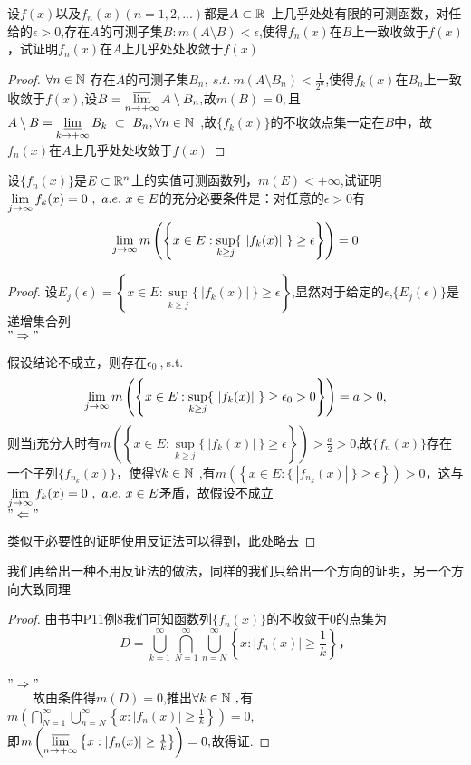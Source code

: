 设$f(x)$以及$f_n(x)(n=1,2,...)$都是$A \subset \R{R}{\ }$上几乎处处有限的可测函数，对任给的$\epsilon>0$,存在$A$的可测子集$B:m(A\setminus B)<\epsilon$,使得$f_n(x)$在$B$上一致收敛于$f(x)$，试证明$f_n(x)$在$A$上几乎处处收敛于$f(x)$
\begin{proof}
	$\forall n\in\R{N}{\ }$存在$A$的可测子集$B_n,\ s.t.\ m(A\setminus B_n)<\frac{1}{2^n}$,使得$f_k(x)$在$B_n$上一致收敛于$f(x)$,设$B=\varlimsup\limits_{n \to +\infty}A\setminus B_n,$故$m(B)=0,$且$A\setminus B=\varliminf\limits_{k \to +\infty}B_k\ \subset\  B_n,\forall n \in \R{N}{\ }$,故$\{f_k(x)\}$的不收敛点集一定在$B$中，故$f_n(x)$在$A$上几乎处处收敛于$f(x)$
\end{proof}


设$\{f_n(x)\}$是$E\subset \mathbb{R}^{n}$上的实值可测函数列，$m(E)<+\infty$,试证明$\lim\limits_{j\to \infty}f_k(x)=0\ ,\ a.e.\ x\in E$的充分必要条件是：对任意的$\epsilon>0$有$$\lim\limits_{j\to\infty}m\left( \left\lbrace x\in E: \sup_{k\geq j} \{\ |f_k(x)|\ \}\geq \epsilon \right\rbrace \right)=0 $$
\begin{proof}
	设$E_j(\epsilon)=\left\lbrace x\in E: \sup\limits_{k\geq j} \{\ |f_k(x)|\ \}\geq \epsilon \right\rbrace$,显然对于给定的$\epsilon$,$\{E_j(\epsilon)\}$是递增集合列\\
	$"\Rightarrow"$\par 
	假设结论不成立，则存在$\epsilon_0\ $,$\ $s.t.$$\lim\limits_{j\to\infty}m\left( \left\lbrace x\in E: \sup\limits_{k\geq j} \{\ |f_k(x)|\ \}\geq \epsilon_0>0 \right\rbrace \right)=a>0 ,$$则当j充分大时有$m\left( \left\lbrace x\in E: \sup\limits_{k\geq j} \{\ |f_k(x)|\ \}\geq \epsilon \right\rbrace \right)>\displaystyle{\frac{a}{2}}>0$,故$\{f_n(x)\}$存在一个子列$\{f_{n_k}(x)\}$，使得$\forall k\in \R{N}{\ }$,有$m\left( \left\lbrace x\in E:  \{\ |f_{n_k}(x)|\ \}\geq \epsilon \right\rbrace \right)>0$，这与$\lim\limits_{j\to \infty}f_k(x)=0\ ,\ a.e.\ x\in E$矛盾，故假设不成立\\
	$"\Leftarrow"$\par 类似于必要性的证明使用反证法可以得到，此处略去
\end{proof}
我们再给出一种不用反证法的做法，同样的我们只给出一个方向的证明，另一个方向大致同理
\begin{proof}
	由书中P11例8我们可知函数列$\{f_n(x)\}$的不收敛于0的点集为$$D=\bigcup_{k=1}^{\infty}\bigcap_{N=1}^{\infty}\bigcup_{n=N}^{\infty}\left\lbrace x:|f_n(x)|\geq\frac{1}{k} \right\rbrace ，$$\\
	$"\Rightarrow"$\\
	$\qquad$故由条件得$m(D)=0$,推出$\forall k\in \R{N}{\ },$有$m\left(\bigcap\limits_{N=1}^{\infty}\bigcup\limits_{n=N}^{\infty}\left\lbrace x:|f_n(x)|\geq\frac{1}{k} \right\rbrace \right)=0 $,\\即$m\left(\varlimsup\limits_{n \to +\infty}\left\lbrace x:|f_n(x)|\geq\frac{1}{k} \right\rbrace \right)=0,$故得证.
\end{proof}



